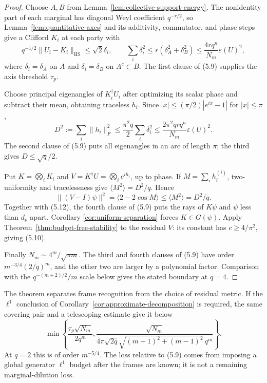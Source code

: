 \begin{proof}
Choose \(A,B\) from Lemma~\ref{lem:collective-support-energy}.  The
nonidentity part of each marginal has diagonal Weyl coefficient
\(q^{-r/2}\), so Lemma~\ref{lem:quantitative-axes} and its
additivity, commutator, and phase steps give a Clifford \(K_i\) at each
party with
\[
 q^{-1/2}\lVert U_i-K_i\rVert_{\mathrm{HS}}
 \leq\sqrt2\delta_i,\qquad
 \sum_i\delta_i^2
 \leq r(\delta_A^2+\delta_B^2)
 \leq\frac{4rq^n}{N_m}\varepsilon(U)^2,          \tag{5.11}
\]
where \(\delta_i=\delta_A\) on \(A\) and \(\delta_i=\delta_B\) on
\(A^c\subset B\).  The first clause of (5.9) supplies the axis threshold
\(\tau_p\).

Choose principal eigenangles of \(K_i^\dagger U_i\) after optimizing its
scalar phase and subtract their mean, obtaining traceless \(h_i\).
Since \(|x|\leq(\pi/2)|e^{ix}-1|\) for \(|x|\leq\pi\),
\[
 D^2:=\sum_i\lVert h_i\rVert_F^2
 \leq\frac{\pi^2q}{2}\sum_i\delta_i^2
 \leq\frac{2\pi^2qrq^n}{N_m}\varepsilon(U)^2.   \tag{5.12}
\]
The second clause of (5.9) puts all eigenangles in an arc of length
\(\pi\); the third gives \(D\leq\sqrt q/2\).

Put \(K=\bigotimes_iK_i\) and
\(V=K^\dagger U=\bigotimes_ie^{ih_i}\), up to phase.  If
\(M=\sum_ih_i^{(i)}\), two-uniformity and tracelessness give
\(\langle M^2\rangle=D^2/q\).  Hence
\[
 \lVert(V-I)\psi\rVert^2
 =\langle2-2\cos M\rangle\leq\langle M^2\rangle=D^2/q.
\]
Together with (5.12), the fourth clause of (5.9) puts the rays of
\(K\psi\) and \(\psi\) less than \(d_p\) apart.  Corollary
\ref{cor:uniform-separation} forces \(K\in G(\psi)\).  Apply
Theorem~\ref{thm:budget-free-stability} to the residual \(V\): its
constant has \(c\geq4/\pi^2\), giving (5.10).

Finally \(N_m\sim4^m/\sqrt{\pi m}\).  The third and fourth clauses of
(5.9) have order \(m^{-3/4}(2/q)^m\), and the other two are larger by a
polynomial factor.  Comparison with the
\(q^{-(m+2)/2}/m\) scale below gives the stated boundary at \(q=4\).
\end{proof}

The theorem separates frame recognition from the choice of residual
metric.  If the \(\ell^1\) conclusion of
Corollary~\ref{cor:approximate-decomposition} is required, the same
covering pair and a telescoping estimate give it below
\[
 \min\left\{
  \frac{\tau_p\sqrt{N_m}}{2q^m},
  \frac{\sqrt{N_m}}
       {4\pi\sqrt{2q}\sqrt{(m+1)^2+(m-1)^2}\,q^m}
 \right\}.                                           \tag{5.13}
\]
At \(q=2\) this is of order \(m^{-5/4}\).  The loss relative to (5.9)
comes from imposing a global generator \(\ell^1\) budget after the frames
are known; it is not a remaining marginal-dilution loss.

